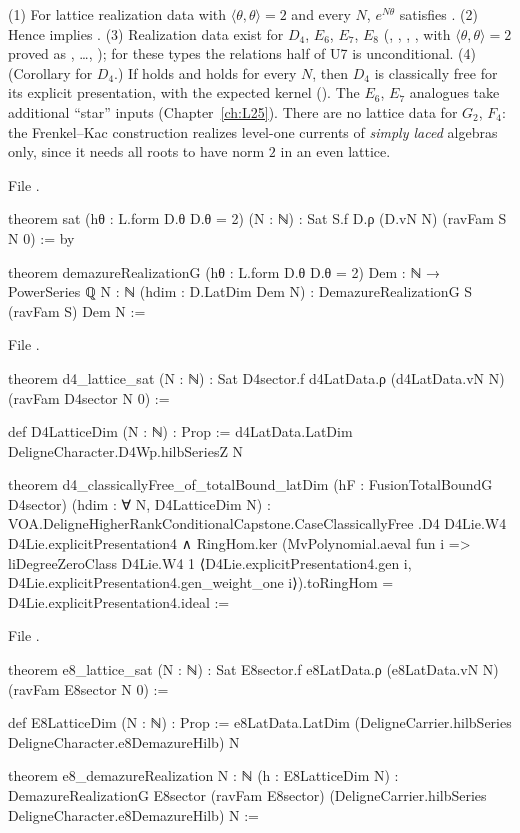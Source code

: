 \begin{theorem}\label{l26:thm:latsat}
(1) For lattice realization data with $\langle\theta,\theta\rangle=2$ and every $N$, $e^{N\theta}$ satisfies .
(2) Hence  implies .
(3) Realization data exist for $D_4$, $E_6$, $E_7$, $E_8$ (, , , ,
with $\langle\theta,\theta\rangle=2$ proved as , \dots, ); for these types the relations half of U7 is
unconditional.
(4) (Corollary for $D_4$.) If  holds and  holds for every $N$, then $D_4$ is
classically free for its explicit presentation, with the expected kernel (). The
$E_6$, $E_7$ analogues take additional ``star'' inputs (Chapter~\ref{ch:L25}).
There are no lattice data for $G_2$, $F_4$: the Frenkel--Kac construction realizes level-one currents of \emph{simply laced}
algebras only, since it needs all roots to have norm $2$ in an even lattice.
\end{theorem}
\noindent File .
\begin{leancode}
theorem sat (hθ : L.form D.θ D.θ = 2) (N : ℕ) : Sat S.f D.ρ (D.vN N) (ravFam S N 0) := by

theorem demazureRealizationG (hθ : L.form D.θ D.θ = 2) {Dem : ℕ → PowerSeries ℚ} {N : ℕ}
    (hdim : D.LatDim Dem N) : DemazureRealizationG S (ravFam S) Dem N :=
\end{leancode}
\noindent File .
\begin{leancode}
theorem d4_lattice_sat (N : ℕ) : Sat D4sector.f d4LatData.ρ (d4LatData.vN N) (ravFam D4sector N 0) :=

def D4LatticeDim (N : ℕ) : Prop :=
  d4LatData.LatDim DeligneCharacter.D4Wp.hilbSeriesZ N

theorem d4_classicallyFree_of_totalBound_latDim (hF : FusionTotalBoundG D4sector)
    (hdim : ∀ N, D4LatticeDim N) :
    VOA.DeligneHigherRankConditionalCapstone.CaseClassicallyFree .D4 D4Lie.W4 D4Lie.explicitPresentation4 ∧
      RingHom.ker (MvPolynomial.aeval fun i =>
        liDegreeZeroClass D4Lie.W4 1 ⟨D4Lie.explicitPresentation4.gen i,
          D4Lie.explicitPresentation4.gen_weight_one i⟩).toRingHom =
        D4Lie.explicitPresentation4.ideal :=
\end{leancode}
\noindent File .
\begin{leancode}
theorem e8_lattice_sat (N : ℕ) : Sat E8sector.f e8LatData.ρ (e8LatData.vN N) (ravFam E8sector N 0) :=

def E8LatticeDim (N : ℕ) : Prop :=
  e8LatData.LatDim (DeligneCarrier.hilbSeries DeligneCharacter.e8DemazureHilb) N

theorem e8_demazureRealization {N : ℕ} (h : E8LatticeDim N) :
    DemazureRealizationG E8sector (ravFam E8sector) (DeligneCarrier.hilbSeries DeligneCharacter.e8DemazureHilb) N :=
\end{leancode}

